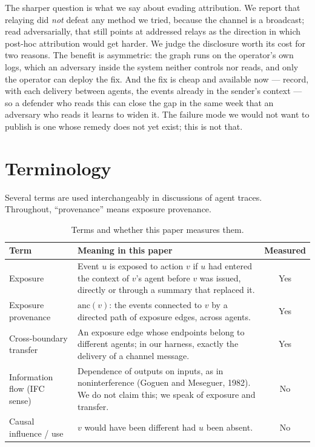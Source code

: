 \documentclass[11pt, a4paper]{article}
\begin{document}
The sharper question is what we say about evading attribution. We report that relaying did \emph{not} defeat any method we tried, because the channel is a broadcast; read adversarially, that still points at addressed relays as the direction in which post-hoc attribution would get harder. We judge the disclosure worth its cost for two reasons. The benefit is asymmetric: the graph runs on the operator's own logs, which an adversary inside the system neither controls nor reads, and only the operator can deploy the fix. And the fix is cheap and available now --- record, with each delivery between agents, the events already in the sender's context --- so a defender who reads this can close the gap in the same week that an adversary who reads it learns to widen it. The failure mode we would not want to publish is one whose remedy does not yet exist; this is not that.

\section{Terminology}
\label{app:terms}

Several terms are used interchangeably in discussions of agent traces. Throughout, ``provenance'' means exposure provenance.

\begin{table}[h]
  \centering
  \small
  \caption{Terms and whether this paper measures them.}
  \label{tab:terms}
  \begin{tabularx}{\linewidth}{lXc}
    \toprule
    Term & Meaning in this paper & Measured \\
    \midrule
    Exposure & Event \(u\) is exposed to action \(v\) if \(u\) had entered the context of \(v\)'s agent before \(v\) was issued, directly or through a summary that replaced it. & Yes \\
    Exposure provenance & \(\mathrm{anc}(v)\): the events connected to \(v\) by a directed path of exposure edges, across agents. & Yes \\
    Cross-boundary transfer & An exposure edge whose endpoints belong to different agents; in our harness, exactly the delivery of a channel message. & Yes \\
    Information flow (IFC sense) & Dependence of outputs on inputs, as in noninterference (Goguen and Meseguer, 1982). We do not claim this; we speak of exposure and transfer. & No \\
    Causal influence / use & \(v\) would have been different had \(u\) been absent. & No \\
    \bottomrule
  \end{tabularx}
\end{table}
\end{document}
